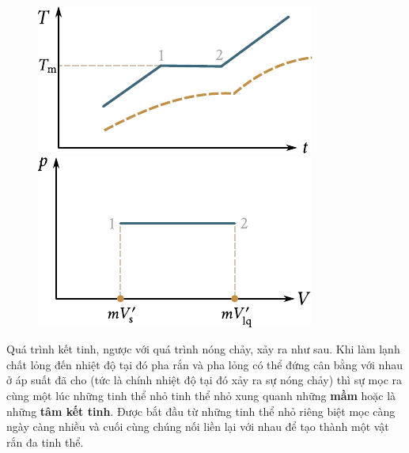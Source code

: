 \begin{figure}[!htb]
	\begin{minipage}[t]{0.5\linewidth}
		\begin{center}
			\includegraphics[scale=1]{figures/ch_15/fig_15_13.pdf}
			\caption[]{}
			\label{fig:15_13}
		\end{center}
	\end{minipage}
	\hspace{-0.05cm}
	\begin{minipage}[t]{0.5\linewidth}
		\begin{center}
			\includegraphics[scale=1]{figures/ch_15/fig_15_14.pdf}
			\caption[]{}
			\label{fig:15_14}
		\end{center}
	\end{minipage}
\end{figure}

Quá trình kết tinh, ngược với quá trình nóng chảy, xảy ra như sau. Khi làm lạnh chất lỏng đến nhiệt độ tại đó pha rắn và pha lỏng có thể đứng cân bằng với nhau ở áp suất đã cho (tức là chính nhiệt độ tại đó xảy ra sự nóng chảy) thì sự mọc ra cùng một lúc những tinh thể nhỏ tinh thể nhỏ xung quanh những \textbf{mầm} hoặc là những \textbf{tâm kết tinh}. Được bắt đầu từ những tinh thể nhỏ riêng biệt mọc càng ngày càng nhiều và cuối cùng chúng nối liền lại với nhau để tạo thành một vật rắn đa tinh thể.\\

